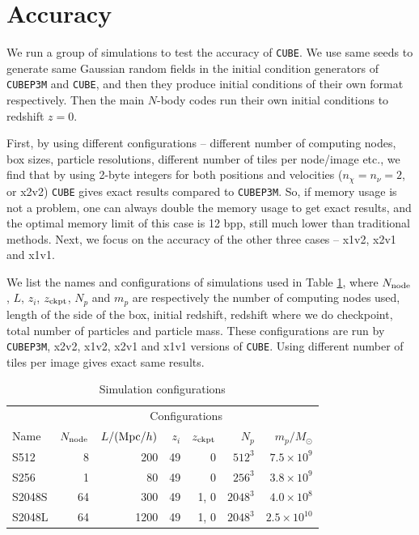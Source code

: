 \documentclass[10pt,twocolumn,preprint]{emulateapj}
\newcommand{\Msun}{M_\odot}
\begin{document}
\section{Accuracy}\label{s.results}
We run a group of simulations to test the accuracy of {\tt CUBE}. We use same seeds to generate same Gaussian random fields in the initial condition generators of {\tt CUBEP3M} and {\tt CUBE}, and then they produce initial conditions of their own format respectively. Then the main $N$-body codes run their own initial conditions to redshift $z=0$.

First, by using different configurations -- different number of computing nodes, box sizes, particle resolutions, different number of tiles per node/image etc., we find that by using 2-byte integers for both positions and velocities ($n_\chi=n_\nu=2$, or x2v2) {\tt CUBE} gives exact results compared to {\tt CUBEP3M}. So, if memory usage is not a problem, one can always double the memory usage to get exact results, and the optimal memory limit of this case is 12 bpp, still much lower than traditional methods. Next, we focus on the accuracy of the other three cases -- x1v2, x2v1 and x1v1.

We list the names and configurations of simulations used in Table \ref{t.sim}, where $N_{\rm node}$, $L$, $z_i$, $z_{\rm ckpt}$, $N_p$ and $m_p$ are respectively the number of computing nodes used, length of the side of the box, initial redshift, redshift where we do checkpoint, total number of particles and particle mass. These configurations are run by {\tt CUBEP3M}, x2v2, x1v2, x2v1 and x1v1 versions of {\tt CUBE}. Using different number of tiles per image gives exact same results.

\begin{table}[]
\centering
\caption{Simulation configurations}
\label{t.sim}
\begin{tabular}{lrrrrrr}
\hline
& \multicolumn{6}{c}{Configurations}\\
\cline{2-7}
Name  & $N_{\rm node}$ & $L/({\rm Mpc}/h)$ & $z_i$ & $z_{\rm ckpt}$ & $N_p$ & $m_p/\Msun$ \\
\hline
S512   & 8     & 200   & 49 & 0    & $512^3$  & $7.5\times 10^9$    \\
S256   & 1     & 80    & 49 & 0    & $256^3$  & $3.8\times 10^9$    \\
S2048S & 64    & 300   & 49 & 1, 0  & $2048^3$ & $4.0\times 10^8$    \\
S2048L & 64    & 1200  & 49 & 1, 0  & $2048^3$ & $2.5\times 10^{10}$    \\
\hline
\end{tabular}
\end{table}
\end{document}
